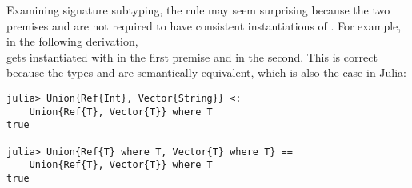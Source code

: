 Examining signature subtyping,
the rule  may seem surprising because the two premises
 and
 are not required
to have consistent instantiations of \UEnv.
For example, in the following derivation,\\
\va gets instantiated with \tyint in the first premise and
\tystr in the second.
This is correct because the types
 and
are semantically equivalent, which is also the case in Julia:
\begin{center}
\begin{minipage}{8cm}
\begin{lstlisting}
julia> Union{Ref{Int}, Vector{String}} <: 
    Union{Ref{T}, Vector{T}} where T
true

julia> Union{Ref{T} where T, Vector{T} where T} == 
    Union{Ref{T}, Vector{T}} where T
true
\end{lstlisting}
\end{minipage}
\end{center}

